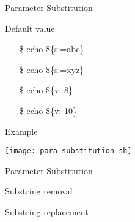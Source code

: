 \begin{frame}{Parameter Substitution}
  \begin{block}{Default value}\ttfamily
    \begin{multicols}{2}
      \begin{itemize}
      \item[\$] echo \$\{s:=abc\}
      \item[\$] echo \$\{s:=xyz\}
      \item[\$] echo \$\{v:-8\}
      \item[\$] echo \$\{v:-10\}
      \end{itemize}
    \end{multicols}
  \end{block}
  \begin{block}{Example}
    \begin{center}
      \texttt{[image: para-substitution-sh]}
    \end{center}
  \end{block}
\end{frame}

\begin{frame}{Parameter Substitution}
  \begin{block}{Substring removal}
  \end{block}
  \begin{block}{Substring replacement}
  \end{block}  
\end{frame}

